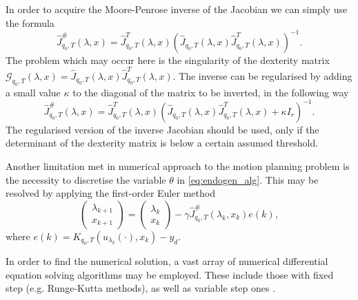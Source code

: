 In order to acquire the Moore-Penrose inverse of the Jacobian we can simply use the formula
\begin{equation}
\hat J^\#_{q_0, T}(\lambda, x)=\hat J^T_{q_0, T}(\lambda, x)\left(\hat J_{q_0, T}(\lambda, x)\hat J^T_{q_0, T}(\lambda, x)\right)^{-1}.
\end{equation}
The problem which may occur here is the singularity of the dexterity matrix\\
$\mathcal{G}_{q_0,T}(\lambda,x)=\hat J_{q_0, T}(\lambda, x)\hat J^T_{q_0, T}(\lambda, x)$.
The inverse can be regularised by adding a small value $\kappa$ to the diagonal of the matrix to
be inverted, in the following way
\begin{equation}
\hat J^\#_{q_0, T}(\lambda, x)=\hat J^T_{q_0, T}(\lambda, x)\left(\hat J_{q_0, T}(\lambda, x)\hat J^T_{q_0, T}(\lambda, x)+\kappa I_r\right)^{-1}.
\end{equation}
The regularised version of the inverse Jacobian should be used, only if the determinant of the dexterity matrix is below a certain assumed threshold.

Another limitation met in numerical approach to the motion planning problem is the necessity to discretise the variable $\theta$ in \eqref{eq:endogen_alg}.
This may be resolved by applying the first-order Euler method
\begin{equation}
\label{eq:endogen_num}
\begin{pmatrix}
\lambda_{k+1}\\
x_{k+1}
\end{pmatrix}  =\begin{pmatrix}\lambda_{k}\\
x_{k}
\end{pmatrix} - \gamma \hat J^\#_{q_0, T}(\lambda_k, x_k)e(k),
\end{equation}
where $e(k)=K_{q_0, T}(u_{\lambda_k}(\cdot), x_k)-y_d$.

In order to find the numerical solution, a vast array of numerical differential
equation solving algorithms may be employed. These include those with fixed step
(e.g. Runge-Kutta methods), as well as variable step ones \cite{solvers}.